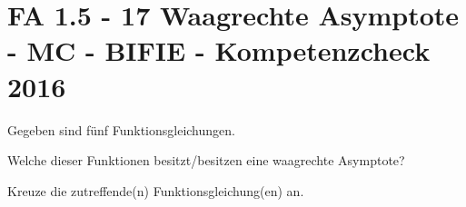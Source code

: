 \section{FA 1.5 - 17 Waagrechte Asymptote - MC - BIFIE - Kompetenzcheck 2016}

\begin{beispiel}[FA 1.5]{1} %
				Gegeben sind fünf Funktionsgleichungen.

Welche dieser Funktionen besitzt/besitzen eine waagrechte Asymptote?

Kreuze die zutreffende(n) Funktionsgleichung(en) an.

\end{beispiel}	